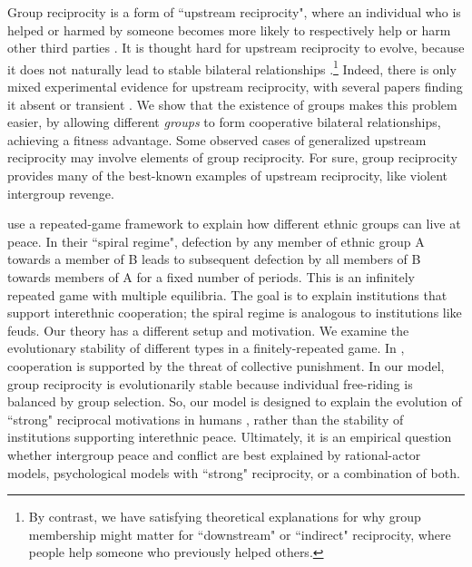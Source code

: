 \documentclass[12pt,a4paper]{article}
\begin{document}
Group reciprocity is a form of ``upstream reciprocity", where an individual who is helped or harmed by someone becomes more likely to respectively help or harm other third parties \parencite{boyd1989evolution}. It is thought hard for upstream reciprocity to evolve, because it does not naturally lead to stable bilateral relationships \parencite{nowak2007upstream}.\footnote{By contrast, we have satisfying theoretical explanations for why group membership might matter for ``downstream" or ``indirect" reciprocity, where people help someone who previously helped others.} Indeed, there is only mixed experimental evidence for upstream reciprocity, with several papers finding it absent or transient \parencite{ben2004reciprocity,stanca2009measuring,van2016indirect,horita2016transient,greiner2005indirect}. We show that the existence of groups makes this problem easier, by allowing different \emph{groups} to form cooperative bilateral relationships, achieving a fitness advantage. Some observed cases of generalized upstream reciprocity \parencite[e.g.][]{mujcic2018indirect,yuan2019gift} may involve elements of group reciprocity. For sure, group reciprocity provides many of the best-known examples of upstream reciprocity, like violent intergroup revenge.

\textcite{fearon1996explaining} use a repeated-game framework to explain how
different ethnic groups can live at peace. In their ``spiral regime", defection
by any member of ethnic group A towards a member of B leads to subsequent 
defection by all members of B towards members of A for a fixed number of periods.
This is an infinitely repeated game with multiple equilibria. The goal is to explain
institutions that support interethnic cooperation; the spiral regime is analogous
to institutions like feuds. Our theory has a different setup and motivation. 
We examine the evolutionary stability of different types in a finitely-repeated game. 
In \textcite{fearon1996explaining}, cooperation is supported by the threat of collective 
punishment. In our model, group reciprocity is evolutionarily stable because 
individual free-riding is balanced by group selection. So, our model
is designed to explain the evolution of ``strong" reciprocal
motivations in humans \parencite{gintis2000strong}, rather than the 
stability of institutions supporting interethnic peace. Ultimately, it is an 
empirical question whether intergroup peace and conflict are best explained 
by rational-actor models, psychological models with ``strong" reciprocity,
or a combination of both.
\end{document}
